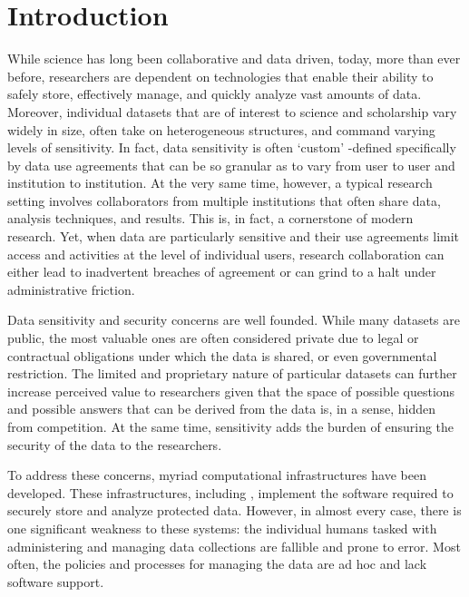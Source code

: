 \section{Introduction}



While science has long been collaborative and data driven, today, more than ever before,
researchers are dependent on technologies that enable their ability to safely store,
effectively manage, and quickly analyze vast amounts of
data. Moreover, individual datasets that are of interest to science and scholarship
vary widely in size, often take on heterogeneous structures, and command varying
levels of sensitivity. In fact, data sensitivity is often `custom' -defined specifically by
data use agreements that can be so granular as to vary from user to user and institution
to institution. At the very same time, however, a typical research setting involves
collaborators from multiple institutions that often share data, analysis techniques,
and results. This is, in fact, a cornerstone of modern research. Yet, when data are
particularly sensitive and their use agreements limit access and activities at the
level of individual users, research collaboration can either lead to inadvertent
breaches of agreement or can grind to a halt under administrative friction.



Data sensitivity and security concerns are well founded. While many datasets are public, the most
valuable ones are often considered private due to legal or contractual obligations under which the data
is shared, or even governmental restriction. The limited and proprietary nature
of particular datasets can further increase perceived value to researchers given that the space of possible questions and possible answers that can be derived from the data is, in a sense, hidden from competition. At the same time, sensitivity adds the burden of
ensuring the security of the data to the researchers.

To address these concerns, myriad computational infrastructures
have been developed. These infrastructures, including \NAMENS \cite{babuji2016cloud},
implement the software required to securely store and analyze protected
data. However, in almost every case, there is one significant weakness to these systems: the individual humans tasked with administering and managing
data collections are fallible and prone to error. Most often, the policies and processes for managing
the data are ad hoc and lack software support.

